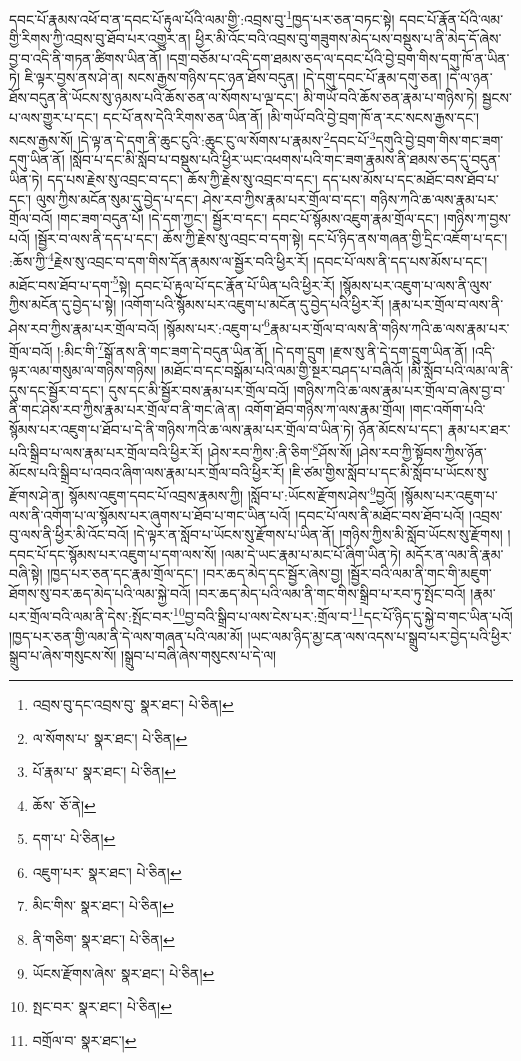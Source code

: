 དབང་པོ་རྣམས་འཕོ་བ་ན་དབང་པོ་རྟུལ་པོའི་ལམ་གྱི་:འབྲས་བུ་\footnote{འབྲས་བུ་དང་འབྲས་བུ་  སྣར་ཐང་།  པེ་ཅིན། }ཁྱད་པར་ཅན་བཏང་སྟེ། དབང་པོ་རྣོན་པོའི་ལམ་གྱི་རིགས་ཀྱི་འབྲས་བུ་ཐོབ་པར་འགྱུར་ན། ཕྱིར་མི་འོང་བའི་འབྲས་བུ་གཟུགས་མེད་པས་བསྡུས་པ་ནི་མེད་དོ་ཞེས་བྱ་བ་འདི་ནི་གཏན་ཚིགས་ཡིན་ནོ། །དགྲ་བཅོམ་པ་འདི་དག་ཐམས་ཅད་ལ་དབང་པོའི་བྱེ་བྲག་གིས་དགུ་ཁོ་ན་ཡིན་ཏེ། ཇི་ལྟར་བྱས་ནས་ཤེ་ན། སངས་རྒྱས་གཉིས་དང་ཉན་ཐོས་བདུན། །དེ་དགུ་དབང་པོ་རྣམ་དགུ་ཅན། །དེ་ལ་ཉན་ཐོས་བདུན་ནི་ཡོངས་སུ་ཉམས་པའི་ཆོས་ཅན་ལ་སོགས་པ་ལྔ་དང་། མི་གཡོ་བའི་ཆོས་ཅན་རྣམ་པ་གཉིས་ཏེ། སྦྱངས་པ་ལས་གྱུར་པ་དང་། དང་པོ་ནས་དེའི་རིགས་ཅན་ཡིན་ནོ། །མི་གཡོ་བའི་བྱེ་བྲག་ཁོ་ན་རང་སངས་རྒྱས་དང་། སངས་རྒྱས་སོ། །དེ་ལྟ་ན་དེ་དག་ནི་ཆུང་ངུའི་:ཆུང་ངུ་ལ་སོགས་པ་རྣམས་\footnote{ལ་སོགས་པ་  སྣར་ཐང་།  པེ་ཅིན། }དབང་པོ་\footnote{པོ་རྣམ་པ་  སྣར་ཐང་།  པེ་ཅིན། }དགུའི་བྱེ་བྲག་གིས་གང་ཟག་དགུ་ཡིན་ནོ། །སློབ་པ་དང་མི་སློབ་པ་བསྡུས་པའི་ཕྱིར་ཡང་འཕགས་པའི་གང་ཟག་རྣམས་ནི་ཐམས་ཅད་དུ་བདུན་ཡིན་ཏེ། དད་པས་རྗེས་སུ་འབྲང་བ་དང་། ཆོས་ཀྱི་རྗེས་སུ་འབྲང་བ་དང་། དད་པས་མོས་པ་དང་མཐོང་བས་ཐོབ་པ་དང་། ལུས་ཀྱིས་མངོན་སུམ་དུ་བྱེད་པ་དང་། ཤེས་རབ་ཀྱིས་རྣམ་པར་གྲོལ་བ་དང་། གཉིས་ཀའི་ཆ་ལས་རྣམ་པར་གྲོལ་བའོ། །གང་ཟག་བདུན་པོ། །དེ་དག་ཀྱང་། སྦྱོར་བ་དང་། དབང་པོ་སྙོམས་འཇུག་རྣམ་གྲོལ་དང་། །གཉིས་ཀ་བྱས་པའོ། །སྦྱོར་བ་ལས་ནི་དད་པ་དང་། ཆོས་ཀྱི་རྗེས་སུ་འབྲང་བ་དག་སྟེ། དང་པོ་ཉིད་ནས་གཞན་གྱི་དྲིང་འཇོག་པ་དང་། :ཆོས་ཀྱི་\footnote{ཆོས་  ཅོ་ནེ། }རྗེས་སུ་འབྲང་བ་དག་གིས་དོན་རྣམས་ལ་སྦྱོར་བའི་ཕྱིར་རོ། །དབང་པོ་ལས་ནི་དད་པས་མོས་པ་དང་། མཐོང་བས་ཐོབ་པ་དག་\footnote{དག་པ་  པེ་ཅིན། }སྟེ། དབང་པོ་རྟུལ་པོ་དང་རྣོན་པོ་ཡིན་པའི་ཕྱིར་རོ། །སྙོམས་པར་འཇུག་པ་ལས་ནི་ལུས་ཀྱིས་མངོན་དུ་བྱེད་པ་སྟེ། །འགོག་པའི་སྙོམས་པར་འཇུག་པ་མངོན་དུ་བྱེད་པའི་ཕྱིར་རོ། །རྣམ་པར་གྲོལ་བ་ལས་ནི་ཤེས་རབ་ཀྱིས་རྣམ་པར་གྲོལ་བའོ། །སྙོམས་པར་:འཇུག་པ་\footnote{འཇུག་པར་  སྣར་ཐང་།  པེ་ཅིན། }རྣམ་པར་གྲོལ་བ་ལས་ནི་གཉིས་ཀའི་ཆ་ལས་རྣམ་པར་གྲོལ་བའོ། །:མིང་གི་\footnote{མིང་གིས་  སྣར་ཐང་།  པེ་ཅིན། }སྒོ་ནས་ནི་གང་ཟག་དེ་བདུན་ཡིན་ནོ། །དེ་དག་དྲུག །རྫས་སུ་ནི་དེ་དག་དྲུག་ཡིན་ནོ། །འདི་ལྟར་ལམ་གསུམ་ལ་གཉིས་གཉིས། །མཐོང་བ་དང་བསྒོམ་པའི་ལམ་གྱི་སྔར་བཤད་པ་བཞིའོ། །མི་སློབ་པའི་ལམ་ལ་ནི་དུས་དང་སྦྱོར་བ་དང་། དུས་དང་མི་སྦྱོར་བས་རྣམ་པར་གྲོལ་བའོ། །གཉིས་ཀའི་ཆ་ལས་རྣམ་པར་གྲོལ་བ་ཞེས་བྱ་བ་ནི་གང་ཤེས་རབ་ཀྱིས་རྣམ་པར་གྲོལ་བ་ནི་གང་ཞེ་ན། འགོག་ཐོབ་གཉིས་ཀ་ལས་རྣམ་གྲོལ། །གང་འགོག་པའི་སྙོམས་པར་འཇུག་པ་ཐོབ་པ་དེ་ནི་གཉིས་ཀའི་ཆ་ལས་རྣམ་པར་གྲོལ་བ་ཡིན་ཏེ། ཉོན་མོངས་པ་དང་། རྣམ་པར་ཐར་པའི་སྒྲིབ་པ་ལས་རྣམ་པར་གྲོལ་བའི་ཕྱིར་རོ། །ཤེས་རབ་ཀྱིས་:ནི་ཅིག་\footnote{ནི་གཅིག་  སྣར་ཐང་།  པེ་ཅིན། }ཤོས་སོ། །ཤེས་རབ་ཀྱི་སྟོབས་ཀྱིས་ཉོན་མོངས་པའི་སྒྲིབ་པ་འབའ་ཞིག་ལས་རྣམ་པར་གྲོལ་བའི་ཕྱིར་རོ། །ཇི་ཙམ་གྱིས་སློབ་པ་དང་མི་སློབ་པ་ཡོངས་སུ་རྫོགས་ཤེ་ན། སྙོམས་འཇུག་དབང་པོ་འབྲས་རྣམས་ཀྱི། །སློབ་པ་:ཡོངས་རྫོགས་ཤེས་\footnote{ཡོངས་རྫོགས་ཞེས་  སྣར་ཐང་།  པེ་ཅིན། }བྱའོ། །སྙོམས་པར་འཇུག་པ་ལས་ནི་འགོག་པ་ལ་སྙོམས་པར་ཞུགས་པ་ཐོབ་པ་གང་ཡིན་པའོ། །དབང་པོ་ལས་ནི་མཐོང་བས་ཐོབ་པའོ། །འབྲས་བུ་ལས་ནི་ཕྱིར་མི་འོང་བའོ། །དེ་ལྟར་ན་སློབ་པ་ཡོངས་སུ་རྫོགས་པ་ཡིན་ནོ། །གཉིས་ཀྱིས་མི་སློབ་ཡོངས་སུ་རྫོགས། །དབང་པོ་དང་སྙོམས་པར་འཇུག་པ་དག་ལས་སོ། །ལམ་དེ་ཡང་རྣམ་པ་མང་པོ་ཞིག་ཡིན་ཏེ། མདོར་ན་ལམ་ནི་རྣམ་བཞི་སྟེ། །ཁྱད་པར་ཅན་དང་རྣམ་གྲོལ་དང་། །བར་ཆད་མེད་དང་སྦྱོར་ཞེས་བྱ། །སྦྱོར་བའི་ལམ་ནི་གང་གི་མཇུག་ཐོགས་སུ་བར་ཆད་མེད་པའི་ལམ་སྐྱེ་བའོ། །བར་ཆད་མེད་པའི་ལམ་ནི་གང་གིས་སྒྲིབ་པ་རབ་ཏུ་སྤོང་བའོ། །རྣམ་པར་གྲོལ་བའི་ལམ་ནི་དེས་:སྤོང་བར་\footnote{སྤང་བར་  སྣར་ཐང་།  པེ་ཅིན། }བྱ་བའི་སྒྲིབ་པ་ལས་ངེས་པར་:གྲོལ་བ་\footnote{བགྲོལ་བ་  སྣར་ཐང་། }དང་པོ་ཉིད་དུ་སྐྱེ་བ་གང་ཡིན་པའོ། །ཁྱད་པར་ཅན་གྱི་ལམ་ནི་དེ་ལས་གཞན་པའི་ལམ་མོ། །ཡང་ལམ་ཉིད་མྱ་ངན་ལས་འདས་པ་སྒྲུབ་པར་བྱེད་པའི་ཕྱིར་སྒྲུབ་པ་ཞེས་གསུངས་སོ། །སྒྲུབ་པ་བཞི་ཞེས་གསུངས་པ་དེ་ལ། 